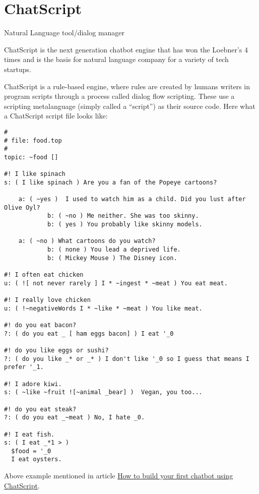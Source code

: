 \documentclass[]{article}
\date{}
\begin{document}
\section{ChatScript}\label{chatscript}

Natural Language tool/dialog manager

ChatScript is the next generation chatbot engine that has won the
Loebner's 4 times and is the basis for natural language company for a
variety of tech startups.

ChatScript is a rule-based engine, where rules are created by humans
writers in program scripts through a process called dialog flow
scripting. These use a scripting metalanguage (simply called a
``script'') as their source code. Here what a ChatScript script file
looks like:

\begin{verbatim}
#
# file: food.top
#
topic: ~food []

#! I like spinach
s: ( I like spinach ) Are you a fan of the Popeye cartoons?
    
    a: ( ~yes )  I used to watch him as a child. Did you lust after Olive Oyl?
            b: ( ~no ) Me neither. She was too skinny.
            b: ( yes ) You probably like skinny models.
    
    a: ( ~no ) What cartoons do you watch?
            b: ( none ) You lead a deprived life.
            b: ( Mickey Mouse ) The Disney icon.

#! I often eat chicken
u: ( ![ not never rarely ] I * ~ingest * ~meat ) You eat meat.

#! I really love chicken
u: ( !~negativeWords I * ~like * ~meat ) You like meat.

#! do you eat bacon?
?: ( do you eat _ [ ham eggs bacon] ) I eat '_0

#! do you like eggs or sushi?
?: ( do you like _* or _* ) I don't like '_0 so I guess that means I prefer '_1.

#! I adore kiwi.
s: ( ~like ~fruit ![~animal _bear] )  Vegan, you too...

#! do you eat steak?
?: ( do you eat _~meat ) No, I hate _0.

#! I eat fish.
s: ( I eat _*1 > ) 
  $food = '_0 
  I eat oysters.
\end{verbatim}

Above example mentioned in article
\href{https://medium.freecodecamp.com/chatscript-for-beginners-chatbots-developers-c58bb591da8\#.2qdxjuyvs}{How
to build your first chatbot using ChatScript}.
\end{document}

